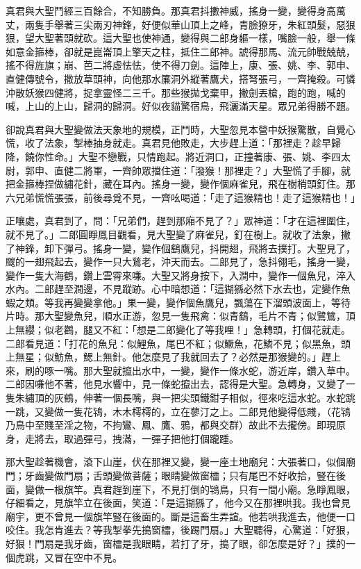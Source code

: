 真君與大聖鬥經三百餘合，不知勝負。那真君抖擻神威，搖身一變，變得身高萬丈，兩隻手舉著三尖兩刃神鋒，好便似華山頂上之峰，青臉獠牙，朱紅頭髮，惡狠狠，望大聖著頭就砍。這大聖也使神通，變得與二郎身軀一樣，嘴臉一般，舉一條如意金箍棒，卻就是崑崙頂上擎天之柱，抵住二郎神。諕得那馬、流元帥戰兢兢，搖不得旌旗；崩、芭二將虛怯怯，使不得刀劍。這陣上，康、張、姚、李、郭申、直健傳號令，撒放草頭神，向他那水簾洞外縱著鷹犬，搭弩張弓，一齊掩殺。可憐沖散妖猴四健將，捉拿靈怪二三千。那些猴拋戈棄甲，撇劍丟槍，跑的跑，喊的喊，上山的上山，歸洞的歸洞。好似夜貓驚宿鳥，飛灑滿天星。眾兄弟得勝不題。

卻說真君與大聖變做法天象地的規模，正鬥時，大聖忽見本營中妖猴驚散，自覺心慌，收了法象，掣棒抽身就走。真君見他敗走，大步趕上道：「那裡走？趁早歸降，饒你性命。」大聖不戀戰，只情跑起。將近洞口，正撞著康、張、姚、李四太尉，郭申、直健二將軍，一齊帥眾擋住道：「潑猴！那裡走？」大聖慌了手腳，就把金箍棒捏做繡花針，藏在耳內。搖身一變，變作個麻雀兒，飛在樹梢頭釘住。那六兄弟慌慌張張，前後尋覓不見，一齊吆喝道：「走了這猴精也！走了這猴精也！」

正嚷處，真君到了，問：「兄弟們，趕到那廂不見了？」眾神道：「才在這裡圍住，就不見了。」二郎圓睜鳳目觀看，見大聖變了麻雀兒，釘在樹上。就收了法象，撇了神鋒，卸下彈弓。搖身一變，變作個鷂鷹兒，抖開翅，飛將去撲打。大聖見了，颼的一翅飛起去，變作一只大鶿老，沖天而去。二郎見了，急抖翎毛，搖身一變，變作一隻大海鶴，鑽上雲霄來嗛。大聖又將身按下，入澗中，變作一個魚兒，淬入水內。二郎趕至澗邊，不見蹤跡。心中暗想道：「這猢猻必然下水去也，定變作魚蝦之類。等我再變變拿他。」果一變，變作個魚鷹兒，飄蕩在下溜頭波面上，等待片時。那大聖變魚兒，順水正游，忽見一隻飛禽：似青鷂，毛片不青；似鷺鷥，頂上無纓；似老鸛，腿又不紅：「想是二郎變化了等我哩！」急轉頭，打個花就走。二郎看見道：「打花的魚兒：似鯉魚，尾巴不紅；似鱖魚，花鱗不見；似黑魚，頭上無星；似魴魚，鰓上無針。他怎麼見了我就回去了？必然是那猴變的。」趕上來，刷的啄一嘴。那大聖就攛出水中，一變，變作一條水蛇，游近岸，鑽入草中。二郎因嗛他不著，他見水響中，見一條蛇攛出去，認得是大聖。急轉身，又變了一隻朱繡頂的灰鶴，伸著一個長嘴，與一把尖頭鐵鉗子相似，徑來吃這水蛇。水蛇跳一跳，又變做一隻花鴇，木木樗樗的，立在蓼汀之上。二郎見他變得低賤，（花鴇乃鳥中至賤至淫之物，不拘鸞、鳳、鷹、鴉，都與交群）故此不去攏傍。即現原身，走將去，取過彈弓，拽滿，一彈子把他打個躘踵。

那大聖趁著機會，滾下山崖，伏在那裡又變，變一座土地廟兒：大張著口，似個廟門；牙齒變做門扇；舌頭變做菩薩；眼睛變做窗櫺；只有尾巴不好收拾，豎在後面，變做一根旗竿。真君趕到崖下，不見打倒的鴇鳥，只有一間小廟。急睜鳳眼，仔細看之，見旗竿立在後面，笑道：「是這猢猻了，他今又在那裡哄我。我也曾見廟宇，更不曾見一個旗竿豎在後面的。斷是這畜生弄諠。他若哄我進去，他便一口咬住。我怎肯進去？等我掣拳先搗窗櫺，後踢門扇。」大聖聽得，心驚道：「好狠，好狠！門扇是我牙齒，窗櫺是我眼睛，若打了牙，搗了眼，卻怎麼是好？」撲的一個虎跳，又冒在空中不見。

